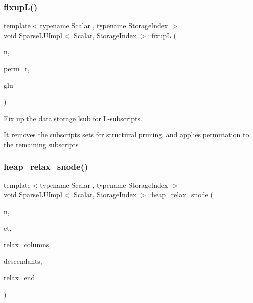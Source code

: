 \subsubsection{\texorpdfstring{fixupL()}{fixupL()}}
{\footnotesize\ttfamily template$<$typename Scalar , typename Storage\+Index $>$ \\
void \mbox{\hyperlink{class_eigen_1_1internal_1_1_sparse_l_u_impl}{Sparse\+L\+U\+Impl}}$<$ Scalar, Storage\+Index $>$\+::fixupL (\begin{DoxyParamCaption}\item[{const Index}]{n,  }\item[{const \mbox{\hyperlink{class_eigen_1_1_matrix}{Index\+Vector}} \&}]{perm\+\_\+r,  }\item[{\mbox{\hyperlink{struct_eigen_1_1internal_1_1_l_u___global_l_u__t}{Global\+L\+U\+\_\+t}} \&}]{glu }\end{DoxyParamCaption})\hspace{0.3cm}{\ttfamily [protected]}}



Fix up the data storage lsub for L-\/subscripts. 

It removes the subscripts sets for structural pruning, and applies permutation to the remaining subscripts \mbox{\label{class_eigen_1_1internal_1_1_sparse_l_u_impl_a88952ce33c968374b149e31d0539178d}} 
\subsubsection{\texorpdfstring{heap\_relax\_snode()}{heap\_relax\_snode()}}
{\footnotesize\ttfamily template$<$typename Scalar , typename Storage\+Index $>$ \\
void \mbox{\hyperlink{class_eigen_1_1internal_1_1_sparse_l_u_impl}{Sparse\+L\+U\+Impl}}$<$ Scalar, Storage\+Index $>$\+::heap\+\_\+relax\+\_\+snode (\begin{DoxyParamCaption}\item[{const Index}]{n,  }\item[{\mbox{\hyperlink{class_eigen_1_1_matrix}{Index\+Vector}} \&}]{et,  }\item[{const Index}]{relax\+\_\+columns,  }\item[{\mbox{\hyperlink{class_eigen_1_1_matrix}{Index\+Vector}} \&}]{descendants,  }\item[{\mbox{\hyperlink{class_eigen_1_1_matrix}{Index\+Vector}} \&}]{relax\+\_\+end }\end{DoxyParamCaption})\hspace{0.3cm}{\ttfamily [protected]}}



